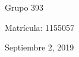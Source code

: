 \documentclass[12pt, letterpaper]{article}
\begin{document}
\begin{titlepage}
{	%
	
	
	\vfill
	{\large Grupo 393}

	{\large Matrícula: 1155057}
	\vfill
	\vfill %
	
	{\large Septiembre 2, 2019} %
	
	
	 
	
	\vfill %
}	
\end{titlepage}

\end{document}
